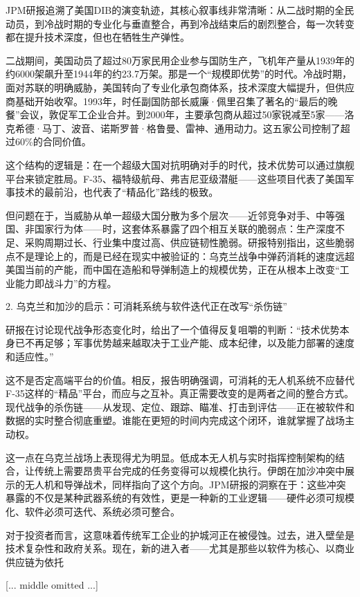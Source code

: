 \documentclass[11pt]{ctexart}
\begin{document}
JPM研报追溯了美国DIB的演变轨迹，其核心叙事线非常清晰：从二战时期的全民动员，到冷战时期的专业化与垂直整合，再到冷战结束后的剧烈整合，每一次转变都在提升技术深度，但也在牺牲生产弹性。

二战期间，美国动员了超过80万家民用企业参与国防生产，飞机年产量从1939年的约6000架飙升至1944年的约23.7万架。那是一个“规模即优势”的时代。冷战时期，面对苏联的明确威胁，美国转向了专业化承包商体系，技术深度大幅提升，但供应商基础开始收窄。1993年，时任副国防部长威廉·佩里召集了著名的“最后的晚餐”会议，敦促军工企业合并。到2000年，主要承包商从超过50家锐减至5家——洛克希德·马丁、波音、诺斯罗普·格鲁曼、雷神、通用动力。这五家公司控制了超过60\%的合同价值。

这个结构的逻辑是：在一个超级大国对抗明确对手的时代，技术优势可以通过旗舰平台来锁定胜局。F-35、福特级航母、弗吉尼亚级潜艇——这些项目代表了美国军事技术的最前沿，也代表了“精品化”路线的极致。

但问题在于，当威胁从单一超级大国分散为多个层次——近邻竞争对手、中等强国、非国家行为体——时，这套体系暴露了四个相互关联的脆弱点：生产深度不足、采购周期过长、行业集中度过高、供应链韧性脆弱。研报特别指出，这些脆弱点不是理论上的，而是已经在现实中被验证的：乌克兰战争中弹药消耗的速度远超美国当前的产能，而中国在造船和导弹制造上的规模优势，正在从根本上改变“工业能力即战斗力”的方程。

2. 乌克兰和加沙的启示：可消耗系统与软件迭代正在改写“杀伤链”

研报在讨论现代战争形态变化时，给出了一个值得反复咀嚼的判断：“技术优势本身已不再足够；军事优势越来越取决于工业产能、成本纪律，以及能力部署的速度和适应性。”

这不是否定高端平台的价值。相反，报告明确强调，可消耗的无人机系统不应替代F-35这样的“精品”平台，而应与之互补。真正需要改变的是两者之间的整合方式。现代战争的杀伤链——从发现、定位、跟踪、瞄准、打击到评估——正在被软件和数据的实时整合彻底重塑。谁能在更短的时间内完成这个闭环，谁就掌握了战场主动权。

这一点在乌克兰战场上表现得尤为明显。低成本无人机与实时指挥控制架构的结合，让传统上需要昂贵平台完成的任务变得可以规模化执行。伊朗在加沙冲突中展示的无人机和导弹战术，同样指向了这个方向。JPM研报的洞察在于：这些冲突暴露的不仅是某种武器系统的有效性，更是一种新的工业逻辑——硬件必须可规模化、软件必须可迭代、系统必须可整合。

对于投资者而言，这意味着传统军工企业的护城河正在被侵蚀。过去，进入壁垒是技术复杂性和政府关系。现在，新的进入者——尤其是那些以软件为核心、以商业供应链为依托

[... middle omitted ...]
\end{document}
